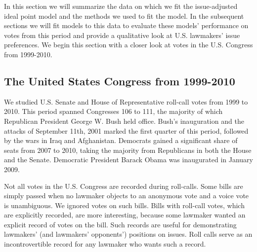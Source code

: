        


\label{sec:empirical_analysis}

In this section we will summarize the data on which we fit the
issue-adjusted ideal point model and the methods we used to fit the
model. In the subsequent sections we will fit models to this data to
evaluate these models' performance on votes from this period and
provide a qualitative look at U.S. lawmakers' issue preferences. We
begin this section with a closer look at votes in the U.S. Congress
from 1999-2010.

\subsection{The United States Congress from 1999-2010}
We studied U.S. Senate and House of Representative roll-call votes
from 1999 to 2010.  This period spanned Congresses 106 to 111, the
majority of which Republican President George W. Bush held office.
Bush's inauguration and the attacks of September 11th, 2001 marked the
first quarter of this period, followed by the wars in Iraq and
Afghanistan.  Democrats gained a significant share of seats from 2007
to 2010, taking the majority from Republicans in both the House and
the Senate. Democratic President Barack Obama was inaugurated in
January 2009.


Not all votes in the U.S. Congress are recorded during roll-calls.
Some bills are simply passed when no lawmaker objects to an anonymous
vote and a voice vote is unambiguous.  We ignored votes on such bills.
Bills with roll-call votes, which are explicitly recorded, are more
interesting, because some lawmaker wanted an explicit record of votes
on the bill. Such records are useful for demonstrating lawmakers' (and
lawmakers' opponents') positions on issues.  Roll calls serve as an
incontrovertible record for any lawmaker who wants such a record.

